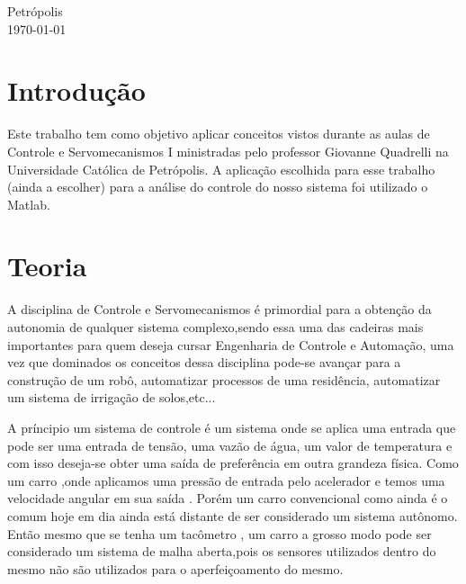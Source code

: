 \documentclass[11pt]{article}
\begin{document}
\begin{titlepage}
	
	
	\vfill\vfill\vfill %
	Petrópolis\\
	{\large\today} %
	
	
	 
	
	\vfill %
	
\end{titlepage}
\newpage

\tableofcontents
\newpage
\section{Introdução}
Este trabalho tem como objetivo aplicar conceitos vistos durante as aulas de Controle e Servomecanismos I ministradas pelo professor Giovanne Quadrelli na Universidade Católica de Petrópolis. A aplicação escolhida para esse trabalho (ainda a escolher) para a análise do controle do nosso sistema foi utilizado o Matlab.

\section{Teoria}
A disciplina de Controle e Servomecanismos é primordial para a obtenção da autonomia de qualquer sistema complexo,sendo essa uma das cadeiras mais importantes para quem deseja cursar Engenharia de Controle e Automação, uma vez que dominados os conceitos dessa disciplina pode-se avançar para a construção de um robô, automatizar processos de uma residência, automatizar um sistema de irrigação de solos,etc... 

A príncipio um sistema de controle é um sistema onde se aplica uma entrada que pode ser uma entrada de tensão, uma vazão de água, um valor de temperatura e com isso deseja-se obter uma saída de preferência em outra grandeza física. Como um carro ,onde aplicamos uma pressão de entrada pelo acelerador e temos uma velocidade angular em sua saída . Porém um carro convencional como ainda é o comum hoje em dia ainda está distante de ser considerado um sistema autônomo. Então mesmo que se tenha um tacômetro , um carro a grosso modo pode ser considerado um sistema de malha aberta,pois os sensores utilizados dentro do mesmo não são utilizados para o aperfeiçoamento do mesmo. 
\end{document}
